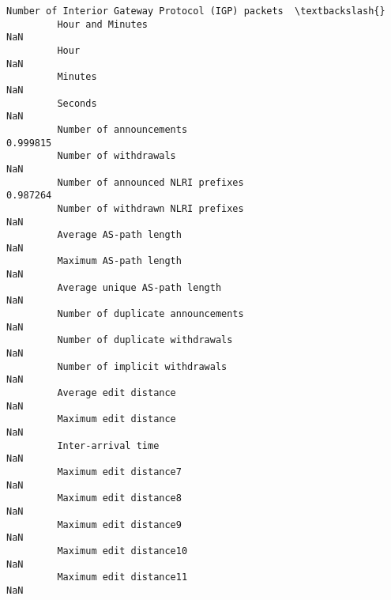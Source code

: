 \documentclass[11pt]{article}
\begin{document}
\begin{Verbatim}[commandchars=\\\{\}]
                                                            Number of Interior Gateway Protocol (IGP) packets  \textbackslash{}
         Hour and Minutes                                                                                 NaN   
         Hour                                                                                             NaN   
         Minutes                                                                                          NaN   
         Seconds                                                                                          NaN   
         Number of announcements                                                                     0.999815   
         Number of withdrawals                                                                            NaN   
         Number of announced NLRI prefixes                                                           0.987264   
         Number of withdrawn NLRI prefixes                                                                NaN   
         Average AS-path length                                                                           NaN   
         Maximum AS-path length                                                                           NaN   
         Average unique AS-path length                                                                    NaN   
         Number of duplicate announcements                                                                NaN   
         Number of duplicate withdrawals                                                                  NaN   
         Number of implicit withdrawals                                                                   NaN   
         Average edit distance                                                                            NaN   
         Maximum edit distance                                                                            NaN   
         Inter-arrival time                                                                               NaN   
         Maximum edit distance7                                                                           NaN   
         Maximum edit distance8                                                                           NaN   
         Maximum edit distance9                                                                           NaN   
         Maximum edit distance10                                                                          NaN   
         Maximum edit distance11                                                                          NaN   

\end{Verbatim}
\end{document}
